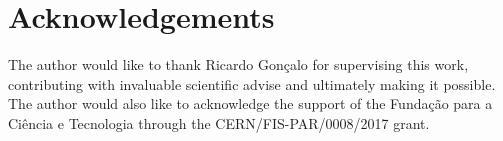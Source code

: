 
\section*{Acknowledgements}

The author would like to thank Ricardo Gon\c calo for supervising this work, contributing with invaluable scientific advise and ultimately making it possible. The author would also like to acknowledge the support of the Funda\c c\~ao para a Ci\^encia e Tecnologia through the CERN/FIS-PAR/0008/2017 grant.
